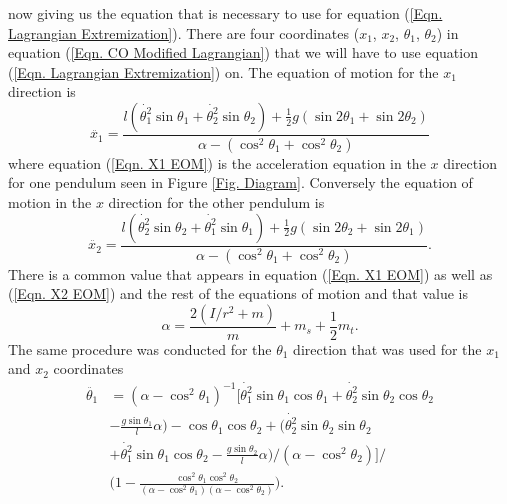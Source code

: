 \documentclass[twocolumn]{article}
\begin{document}
now giving us the equation that is necessary to use for equation (\ref{Eqn. Lagrangian Extremization}). There are four coordinates ($x_1$, $x_2$, $\theta_{1}$, $\theta_{2}$) in equation (\ref{Eqn. CO Modified Lagrangian}) that we will have to use equation (\ref{Eqn. Lagrangian Extremization}) on. The equation of motion for the $x_1$ direction is
\begin{equation}\label{Eqn. X1 EOM}
\ddot{x_1}=\frac{l(\dot{\theta_{1}^2}\sin{\theta_{1}}+\dot{\theta_{2}^2}\sin{\theta_{2}})+\frac{1}{2}g(\sin{2\theta_{1}}+\sin{2\theta_{2}})}{\alpha-(\cos^2{\theta_{1}}+\cos^2{\theta_{2}})}
\end{equation}
where equation (\ref{Eqn. X1 EOM}) is the acceleration equation in the $x$ direction for one pendulum seen in Figure \ref{Fig. Diagram}. Conversely the equation of motion in the $x$ direction for the other pendulum is
\begin{equation}\label{Eqn. X2 EOM}
\ddot{x_2}=\frac{l(\dot{\theta_{2}^2}\sin{\theta_{2}}+\dot{\theta_{1}^2}\sin{\theta_{1}})+\frac{1}{2}g(\sin{2\theta_{2}}+\sin{2\theta_{1}})}{\alpha-(\cos^2{\theta_{1}}+\cos^2{\theta_{2}})}.
\end{equation}
There is a common value that appears in equation (\ref{Eqn. X1 EOM}) as well as (\ref{Eqn. X2 EOM}) and the rest of the equations of motion and that value is
\begin{equation}\label{Eqn. Alpha Def}
\alpha = \frac{2(I/r^2+m)}{m}+m_s+\frac{1}{2}m_t. 
\end{equation}
The same procedure was conducted for the $\theta_1$ direction that was used for the $x_1$ and $x_2$ coordinates
\begin{equation}\label{Eqn. Theta 1 EOM}
\begin{split}
\ddot{\theta_{1}}&=(\alpha-\cos^2{\theta_1})^{-1}\Bigg[\dot{\theta_{1}^2}\sin{\theta_{1}}\cos{\theta_{1}}+\dot{\theta_{2}^2}\sin{\theta_{2}}\cos{\theta_{2}}\\&
-\frac{g\sin{\theta_{1}}}{l}\alpha)-\cos{\theta_{1}}\cos{\theta_{2}}+\Big(\dot{\theta_{2}^2}\sin{\theta_{2}}\sin{\theta_{2}}\\&
+\dot{\theta_{1}^2}\sin{\theta_{1}}\cos{\theta_{2}}-\frac{g\sin{\theta_{2}}}{l}\alpha\Big)/(\alpha-\cos^2{\theta_2})\Bigg]/ \\&
\Bigg(1-\frac{\cos^2{\theta_{1}}\cos^2{\theta_{2}}}{(\alpha-\cos^2{\theta_1})(\alpha-\cos^2{\theta_2})}\Bigg).
\end{split}
\end{equation}
\end{document}
